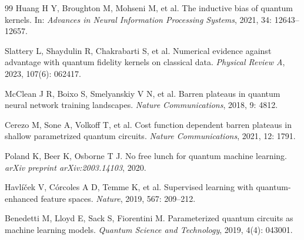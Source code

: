 \documentclass[UTF8,a4paper,zihao=-4,fontset=fandol]{ctexart}
\begin{document}
\begin{thebibliography}{99}
Huang H Y, Broughton M, Mohseni M, et al. The inductive bias of quantum kernels. In: \textit{Advances in Neural Information Processing Systems}, 2021, 34: 12643--12657.

Slattery L, Shaydulin R, Chakrabarti S, et al. Numerical evidence against advantage with quantum fidelity kernels on classical data. \textit{Physical Review A}, 2023, 107(6): 062417.

McClean J R, Boixo S, Smelyanskiy V N, et al. Barren plateaus in quantum neural network training landscapes. \textit{Nature Communications}, 2018, 9: 4812.

Cerezo M, Sone A, Volkoff T, et al. Cost function dependent barren plateaus in shallow parametrized quantum circuits. \textit{Nature Communications}, 2021, 12: 1791.

Poland K, Beer K, Osborne T J. No free lunch for quantum machine learning. \textit{arXiv preprint arXiv:2003.14103}, 2020.

Havlíček V, Córcoles A D, Temme K, et al. Supervised learning with quantum-enhanced feature spaces. \textit{Nature}, 2019, 567: 209--212.

Benedetti M, Lloyd E, Sack S, Fiorentini M. Parameterized quantum circuits as machine learning models. \textit{Quantum Science and Technology}, 2019, 4(4): 043001.

\end{thebibliography}
\end{document}

